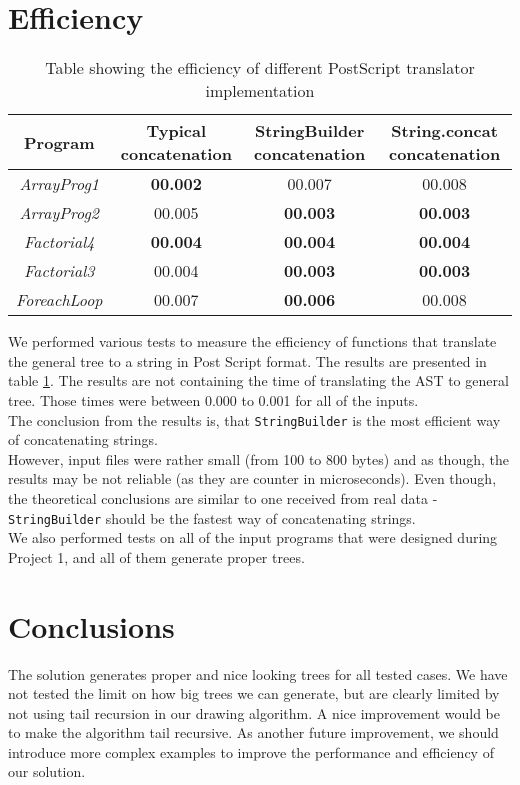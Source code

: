 \documentclass[10pt]{scrartcl}
\begin{document}
\section{Efficiency}
\begin{table} [!h]
\centering
\begin{tabular}{c|c|c|c}
  \textbf{Program} & \textbf{Typical concatenation}  & \textbf{StringBuilder concatenation} & \textbf{String.concat concatenation} \\
  \hline
  \textit{ArrayProg1} & \textbf{00.002} & 00.007 & 00.008 \\
  \hline
  \textit{ArrayProg2} & 00.005 & \textbf{00.003} & \textbf{00.003} \\
  \hline
  \textit{Factorial4} & \textbf{00.004} & \textbf{00.004} & \textbf{00.004} \\
  \hline
  \textit{Factorial3} & 00.004 & \textbf{00.003} & \textbf{00.003} \\
  \hline
  \textit{ForeachLoop} & 00.007 & \textbf{00.006} & 00.008 \\
\end{tabular} 
\caption{Table showing the efficiency of different PostScript translator implementation}
\label{tab:eff}
\end{table}
We performed various  tests to measure the efficiency of functions that translate the general tree to a string in Post Script format. The results are presented in table \ref{tab:eff}. The results are not containing the time of translating the AST to general tree. Those times were between 0.000 to 0.001 for all of the inputs. \\
The conclusion from the results is, that \texttt{StringBuilder} is the most efficient way of concatenating strings. \\
However, input files were rather small (from 100 to 800 bytes) and as though, the results may be not reliable (as they are counter in microseconds). Even though, the theoretical conclusions are similar to one received from real data - \texttt{StringBuilder} should be the fastest way of concatenating strings. \\
We also performed tests on all of the input programs that were designed during Project 1, and all of them generate proper trees. 
\section{Conclusions}
The solution generates proper and nice looking trees for all tested cases. We have not tested the limit on how big trees we can generate, but are clearly limited by not using tail recursion in our drawing algorithm. A nice improvement would be to make the algorithm tail recursive.
As another future improvement, we should introduce more complex examples to improve the performance and efficiency of our solution. 



\end{document}
